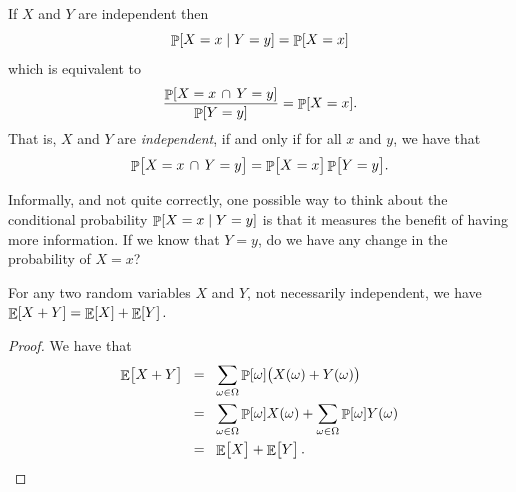 \begin{observation}
    If $X$ and $Y$ are independent then
    \begin{equation*}%
        \ProbCond{X = x}{Y=y} = \Prob{X = x}%
    \end{equation*}
    which is equivalent to
    \begin{equation*}
        \ds \frac{\Prob{X = x \,\cap\, Y=y}}{\Prob{Y=y}} = \Prob{X = x}.
    \end{equation*}
    That is, $X$ and $Y$ are \emph{independent}, if and only if for all
    $x$ and $y$, we have that
    \begin{align*}
      \Prob{\bigl. X = x \,\cap\, Y=y}= \Prob{\bigl. X = x}
      \Prob{\bigl.  Y=y}.
    \end{align*}
\end{observation}

\begin{remark_unnumbered}
    Informally, and not quite correctly, one possible way to think about
    the conditional probability $\mathop{\mathbb{P}}\!\left[ X=x \;\middle\vert\; Y=y \right]$ is that it measures
    the benefit of having more information. If we know that $Y=y$, do we
    have any change in the probability of $X=x$?
\end{remark_unnumbered}


\begin{lemma}
    For any two random var\-iables $X$ and $Y$, not necessarily
    independent, we have
    \begin{math}
        \mathop{\mathbb{E}}\!\left[ {X+Y} \right] = \mathop{\mathbb{E}}\!\left[ {X} \right] + \mathop{\mathbb{E}}\!\left[ {Y} \right].
    \end{math}
\end{lemma}

\begin{proof}
    We have that
    \begin{align*}
        \ds \Ex{\bigl. X+Y}%
        &\EQ%
        \sum_{\omega \in \Omega} \Prob{ \omega} \pth{ \bigl. X(\omega)
           + Y(\omega)}%
        \\&
        \EQ%
        \sum_{\omega \in \Omega} \Prob{\omega} X(\omega) +
        \sum_{\omega \in \Omega} \Prob{\omega} Y(\omega) %
        \\&
        \EQ%
        \Ex{\bigl. X} + \Ex{\bigl. Y}.
    \end{align*}
\end{proof}




